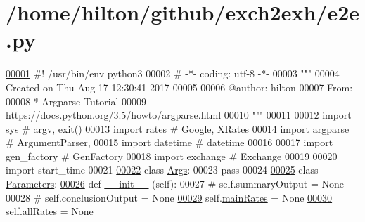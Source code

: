 \hypertarget{e2e_8py_source}{}\section{/home/hilton/github/exch2exh/e2e.py}

\begin{DoxyCode}
\hyperlink{namespacee2e}{00001} \textcolor{comment}{#! /usr/bin/env python3}
00002 \textcolor{comment}{# -*- coding: utf-8 -*-}
00003 \textcolor{stringliteral}{"""}
00004 \textcolor{stringliteral}{Created on Thu Aug 17 12:30:41 2017}
00005 \textcolor{stringliteral}{}
00006 \textcolor{stringliteral}{@author: hilton}
00007 \textcolor{stringliteral}{From:}
00008 \textcolor{stringliteral}{* Argparse Tutorial}
00009 \textcolor{stringliteral}{  https://docs.python.org/3.5/howto/argparse.html}
00010 \textcolor{stringliteral}{"""}
00011 
00012 \textcolor{keyword}{import} sys      \textcolor{comment}{# argv, exit()}
00013 \textcolor{keyword}{import} rates    \textcolor{comment}{# Google, XRates}
00014 \textcolor{keyword}{import} argparse \textcolor{comment}{# ArgumentParser, }
00015 \textcolor{keyword}{import} datetime \textcolor{comment}{# datetime}
00016 
00017 \textcolor{keyword}{import} gen\_factory \textcolor{comment}{# GenFactory}
00018 \textcolor{keyword}{import} exchange    \textcolor{comment}{# Exchange}
00019 
00020 \textcolor{keyword}{import} start\_time
00021 
\hyperlink{classe2e_1_1_args}{00022} \textcolor{keyword}{class }\hyperlink{classe2e_1_1_args}{Args}: 
00023     \textcolor{keywordflow}{pass}
00024 
\hyperlink{classe2e_1_1_parameters}{00025} \textcolor{keyword}{class }\hyperlink{classe2e_1_1_parameters}{Parameters}:
\hyperlink{classe2e_1_1_parameters_a335faddfa9af3ed8ac441e92faec0946}{00026}     \textcolor{keyword}{def }\hyperlink{classe2e_1_1_parameters_a335faddfa9af3ed8ac441e92faec0946}{\_\_init\_\_} (self):
00027 \textcolor{comment}{#        self.summaryOutput        = None}
00028 \textcolor{comment}{#        self.conclusionOutput     = None}
\hyperlink{classe2e_1_1_parameters_aaa2b41d7017ab4893bbe27fa8edb7180}{00029}         self.\hyperlink{classe2e_1_1_parameters_aaa2b41d7017ab4893bbe27fa8edb7180}{mainRates}            = \textcolor{keywordtype}{None}
\hyperlink{classe2e_1_1_parameters_a60eeea35185af8b13a6ea9d797a38dc7}{00030}         self.\hyperlink{classe2e_1_1_parameters_a60eeea35185af8b13a6ea9d797a38dc7}{allRates}             = \textcolor{keywordtype}{None}

\end{DoxyCode}
